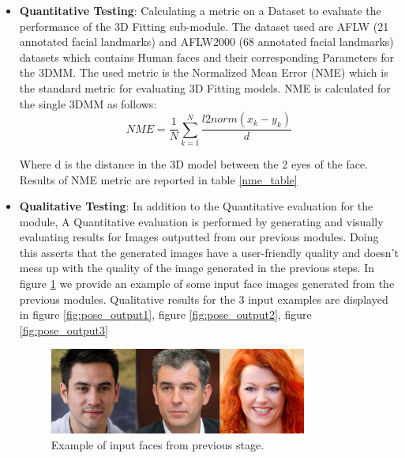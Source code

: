 \begin{itemize}
    \item \textbf{Quantitative Testing}: Calculating a metric on a Dataset to evaluate the performance of the 3D Fitting sub-module. The dataset used are AFLW (21 annotated facial landmarks) and AFLW2000 (68 annotated facial landmarks) datasets which contains Human faces and their corresponding Parameters for the 3DMM. The used metric is the Normalized Mean Error (NME) which is the standard metric for evaluating 3D Fitting models. NME is calculated for the single 3DMM as follows: \\
    
    \[ NME = \frac{1}{N} \sum_{k=1}^{N}\frac{l2norm(x _{k} - y _{k})}{d}\]
    
    Where d is the distance in the 3D model between the 2 eyes of the face. Results of NME metric are reported in table \ref{nme_table}

    \item \textbf{Qualitative Testing}: In addition to the Quantitative evaluation for the module, A Quantitative evaluation is performed by generating and visually evaluating results for Images outputted from our previous modules. Doing this asserts that the generated images have a user-friendly quality and doesn't mess up with the quality of the image generated in the previous steps. In figure \ref{fig:input_pose} we provide an example of some input face images generated from the previous modules. Qualitative results for the 3 input examples are displayed in figure \ref{fig:pose_output1}, figure \ref{fig:pose_output2}, figure \ref{fig:pose_output3}
    
    \begin{figure}[H]
    \centering
    \includegraphics[width=0.8\textwidth]{images/pose_results/faces.jpg}
    \caption{Example of input faces from previous stage.}
    \label{fig:input_pose}
    \end{figure}
    

\end{itemize}
